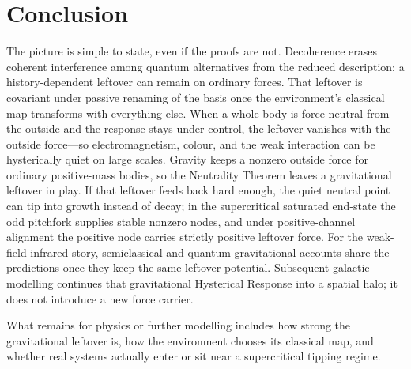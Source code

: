 \documentclass[11pt]{article}
\theoremstyle{definition}
\theoremstyle{remark}
\begin{document}
\section{Conclusion}
\label{sec:conclusion}
The picture is simple to state, even if the proofs are not.
Decoherence erases coherent interference among quantum alternatives from the reduced description; a history-dependent leftover can remain on ordinary forces.
That leftover is covariant under passive renaming of the basis once the environment's classical map transforms with everything else.
When a whole body is force-neutral from the outside and the response stays under control, the leftover vanishes with the outside force---so electromagnetism, colour, and the weak interaction can be hysterically quiet on large scales.
Gravity keeps a nonzero outside force for ordinary positive-mass bodies, so the Neutrality Theorem leaves a gravitational leftover in play.
If that leftover feeds back hard enough, the quiet neutral point can tip into growth instead of decay; in the supercritical saturated end-state the odd pitchfork supplies stable nonzero nodes, and under positive-channel alignment the positive node carries strictly positive leftover force.
For the weak-field infrared story, semiclassical and quantum-gravitational accounts share the predictions once they keep the same leftover potential.
Subsequent galactic modelling continues that gravitational Hysterical Response into a spatial halo; it does not introduce a new force carrier.

What remains for physics or further modelling includes how strong the gravitational leftover is, how the environment chooses its classical map, and whether real systems actually enter or sit near a supercritical tipping regime.
\end{document}

